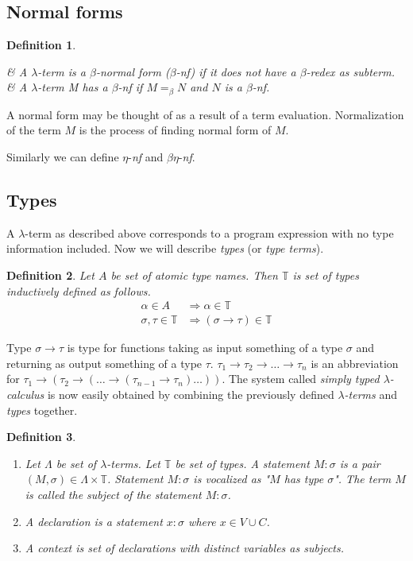 \documentclass{sig-alternate}
\newtheorem{definition}{Definition}
\newcommand{\lterm}{$\lambda$-term\xspace}
\newcommand{\lterms}{$\lambda$-terms\xspace}
\newcommand{\then}{\Rightarrow\xspace}
\newcommand{\beq}{=_\beta}
\newcommand{\bnf}{$\beta$-\textit{nf}\xspace}
\newcommand{\enf}{$\eta$-\textit{nf}\xspace}
\newcommand{\benf}{$\beta\eta$-\textit{nf}\xspace}
\newcommand{\ar}{\rightarrow\xspace}
\newcommand{\T}{\mathbb{T}\xspace}
\begin{document}
\subsection{Normal forms}
\begin{definition}~

\begin{easylist}[enumerate]
& A \lterm is a \textit{$\beta$-normal form} (\bnf) 
if it does not have a $\beta$-redex as subterm.
& A \lterm M \textit{has} a \bnf if $M \beq N$
and $N$ is a \bnf.\\
\end{easylist}
\end{definition}
A normal form may be thought of as a result of a term evaluation. 
Normalization of the term $M$ is the process of finding normal form of $M$. 

Similarly we can define \enf and \benf.

\subsection{Types}

A \lterm as described above
corresponds to a program expression with no type information
included. Now we will describe \textit{types} (or \textit{type terms}).

\begin{definition}
Let $A$ be set of {\it atomic type names}. 
Then $\mathbb{T}$ is set of {\it types} inductively defined as follows.
\begin{align*}
\alpha      \in A  &\then   \alpha \in \T \\
\sigma,\tau \in \T &\then ( \sigma \ar  \tau ) \in \T 
\end{align*}
\end{definition}


Type $\sigma \ar \tau$ is type for functions taking as input
something of a type $\sigma$ and returning 
as output something of a type $\tau$. 
$\tau_1 \ar \tau_2 \ar \dots \ar \tau_n$ is an abbreviation for 
$\tau_1 \ar (\tau_2 \ar (\dots \ar (\tau_{n-1} \ar \tau_n)\dots))$.
The system called \textit{simply typed $\lambda$-calculus} is now easily obtained by
combining the previously defined \textit{\lterms} and \textit{types} together.

\begin{definition}~

\begin{enumerate}
 \item 	Let $\Lambda$ be set of {\it \lterms}. 
	Let $\mathbb{T}$ be set of {\it types}.       
	A {\it statement} $M : \sigma$ is a pair 
	$(M,\sigma) \in \Lambda \times \mathbb{T}$.
	Statement $M : \sigma$ is vocalized as 
	{\it "$M$ has type $\sigma$"}.
	The term $M$ is called the {\it subject} of the 
	statement $M : \sigma$.
 \item A \textit{declaration} is a statement 
 $x : \sigma$ where $x \in V \cup C$.
  
 \item A \textit{context} 
 is set of declarations with distinct variables as subjects.
\end{enumerate}
\end{definition}
\end{document}

